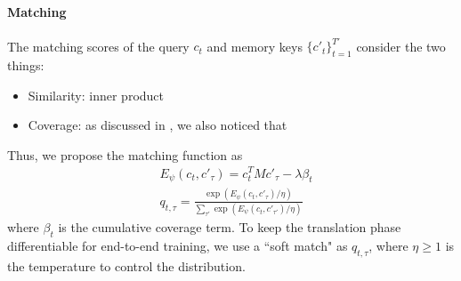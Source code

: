 \documentclass[11pt,letterpaper]{article}
\begin{document}
\paragraph{Matching} 
The matching scores of the query $c_t$ and memory keys $\{c'_t\}_{t=1}^{T'}$ consider the two things:
\begin{itemize}
	\vspace{-5pt}
	\item Similarity: inner product
	\vspace{-5pt}
	\item Coverage: as discussed in \cite{tu2016modeling}, we also noticed that
	\vspace{-5pt}
\end{itemize}
Thus, we propose the matching function as
\begin{equation}
\begin{split}
	&E_{\psi}(c_t, c'_\tau) = c_t^TMc'_\tau - \lambda \beta_t\\
	&q_{t, \tau}  = \frac{\exp(E_{\psi}(c_t, c'_\tau)/\eta)}{\sum_{\tau'} \exp(E_{\psi}(c_t, c'_{\tau'})/\eta)}
\end{split}
\end{equation}
where  $\beta_t$ is the cumulative coverage term. To keep the translation phase differentiable for end-to-end training, we use a ``soft match" as $q_{t,\tau}$, where $\eta \geq 1$ is the temperature to control the distribution. 
\end{document}
